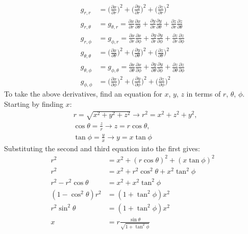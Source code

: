 \documentclass[a4paper]{article}
\begin{document}
\begin{enumerate}
\begin{enumerate}
\[\begin{align*}
    g_{r,r} &=
    \Bigg( \frac{\partial x}{\partial r}\Bigg)^2+
    \Bigg(\frac{\partial y}{\partial r}\Bigg)^2+
    \Bigg(\frac{\partial z}{\partial r}\Bigg)^2\\
    g_{r,\theta} &= g_{\theta,r} = \frac{\partial x}{\partial r} \frac{\partial x}{\partial \theta}
    +\frac{\partial y}{\partial r} \frac{\partial y}{\partial \theta}
    +\frac{\partial z}{\partial r} \frac{\partial z}{\partial \theta}\\
    g_{r,\phi} &= g_{\phi,r} = \frac{\partial x}{\partial r} \frac{\partial x}{\partial \phi}
    + \frac{\partial y}{\partial r} \frac{\partial y}{\partial \phi}
    + \frac{\partial z}{\partial r} \frac{\partial z}{\partial \phi}\\
    g_{\theta,\theta} &=
    \Bigg( \frac{\partial x}{\partial \theta}\Bigg)^2+
    \Bigg(\frac{\partial y}{\partial \theta}\Bigg)^2+
    \Bigg(\frac{\partial z}{\partial \theta}\Bigg)^2\\
    g_{\theta,\phi} &= g_{\phi,\theta} = \frac{\partial x}{\partial \theta} \frac{\partial x}{\partial \phi}
    +\frac{\partial y}{\partial \theta} \frac{\partial y}{\partial \phi}
    +\frac{\partial z}{\partial \theta} \frac{\partial z}{\partial \phi} \\
    g_{\phi,\phi} &=
    \Bigg( \frac{\partial x}{\partial \phi}\Bigg)^2+
    \Bigg(\frac{\partial y}{\partial \phi}\Bigg)^2+
    \Bigg(\frac{\partial z}{\partial \phi}\Bigg)^2
    \end{align*}
  \]
  To take the above derivatives, find an equation for $x$, $y$, $z$ in terms of $r$, $\theta$, $\phi$.
  Starting by finding $x$:
  \[
    \begin{align*}
      &r = \sqrt{x^2 + y^2 + z^2} \to r^2= x^2+z^2+y^2,\\
      &\cos\theta = \frac{z}{r} \to z = r\cos\theta, \\
      &\tan\phi = \frac{y}{x} \to y = x\tan\phi
    \end{align*}
  \]
  Substituting the second and third equation into the first gives:
  \[
    \begin{align*}
      r^2&=x^2+(r\cos\theta)^2+(x\tan\phi)^2\\
      r^2&=x^2+r^2\cos^2\theta+x^2\tan^2\phi\\
      r^2-r^2\cos\theta&=x^2+x^2\tan^2\phi\\
      (1-\cos^2\theta)r^2&=(1+\tan^2\phi)x^2\\
      r^2\sin^2\theta &=(1+\tan^2\phi)x^2\\
      x&=r\frac{\sin\theta}{\sqrt{1+\tan^2\phi}}\\

\end{align*}\]
\end{enumerate}
\end{enumerate}
\end{document}
